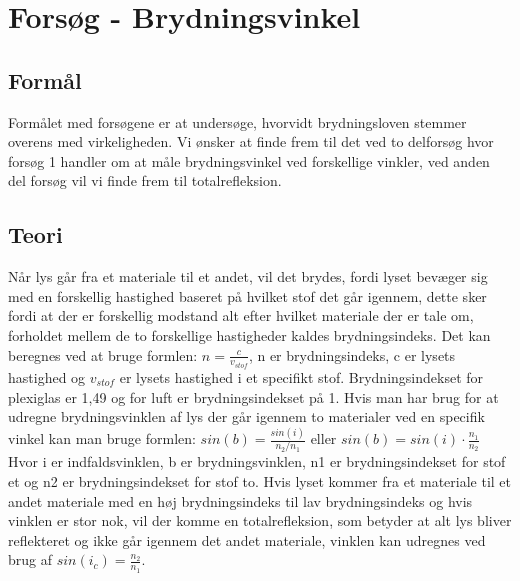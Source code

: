 \section{Forsøg - Brydningsvinkel}
\subsection{Formål}
Formålet med forsøgene er at undersøge, hvorvidt brydningsloven stemmer overens med virkeligheden. Vi ønsker at finde frem til det ved to delforsøg hvor forsøg 1 handler om at måle brydningsvinkel ved forskellige vinkler, ved anden del forsøg vil vi finde frem til totalrefleksion.

\subsection{Teori}
Når lys går fra et materiale til et andet, vil det brydes, fordi lyset bevæger sig med en forskellig hastighed baseret på hvilket stof det går igennem, dette sker fordi at der er forskellig modstand alt efter hvilket materiale der er tale om, forholdet mellem de to forskellige hastigheder kaldes brydningsindeks. Det kan beregnes ved at bruge formlen: \begin{math}n = \frac{c}{v_{stof}}\end{math}, n er brydningsindeks, c er lysets hastighed og \begin{math}v_{stof}\end{math} er lysets hastighed i et specifikt stof. Brydningsindekset for plexiglas er 1,49 og for luft er brydningsindekset på 1. Hvis man har brug for at udregne brydningsvinklen af lys der går igennem to materialer ved en specifik vinkel kan man bruge formlen: \begin{math}sin(b) = \frac{sin(i)}{n_{2}/n_{1}}\end{math} eller \begin{math}sin(b) = sin(i) \cdot \frac{n_{1}}{n_{2}}\end{math}\newline
Hvor i er indfaldsvinklen, b er brydningsvinklen, n1 er brydningsindekset for stof et og n2 er brydningsindekset for stof to.\newline
Hvis lyset kommer fra et materiale til et andet materiale med en høj brydningsindeks til lav brydningsindeks og hvis vinklen er stor nok, vil der komme en totalrefleksion, som betyder at alt lys bliver reflekteret og ikke går igennem det andet materiale, vinklen kan udregnes ved brug af \begin{math}sin(i_{c}) = \frac{n_{2}}{n_{1}}\end{math}.
